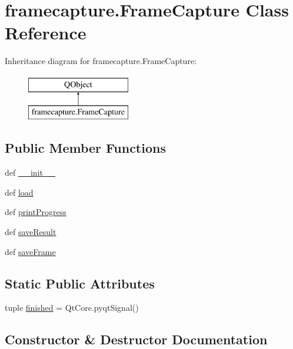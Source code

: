 \hypertarget{classframecapture_1_1FrameCapture}{}\section{framecapture.\+Frame\+Capture Class Reference}
\label{classframecapture_1_1FrameCapture}
Inheritance diagram for framecapture.\+Frame\+Capture\+:\begin{figure}[H]
\begin{center}
\leavevmode
\includegraphics[height=2.000000cm]{classframecapture_1_1FrameCapture}
\end{center}
\end{figure}
\subsection*{Public Member Functions}
\begin{DoxyCompactItemize}
\item 
def \hyperlink{classframecapture_1_1FrameCapture_a7fddffa25cbd27aff798074f2696d972}{\+\_\+\+\_\+init\+\_\+\+\_\+}
\item 
def \hyperlink{classframecapture_1_1FrameCapture_ac7365e9bbf54e647d5fe06b0948686cc}{load}
\item 
def \hyperlink{classframecapture_1_1FrameCapture_a9bad639841b0f732bfa888d4a40b04e2}{print\+Progress}
\item 
def \hyperlink{classframecapture_1_1FrameCapture_ae99fb6ee489801fe9c49a98ec2911793}{save\+Result}
\item 
def \hyperlink{classframecapture_1_1FrameCapture_a84d3496cab0c29ef1c5a22a91aeb8a4c}{save\+Frame}
\end{DoxyCompactItemize}
\subsection*{Static Public Attributes}
\begin{DoxyCompactItemize}
\item 
tuple \hyperlink{classframecapture_1_1FrameCapture_a6127aa7f836ec6cb40c7cc2ca5a8e077}{finished} = Qt\+Core.\+pyqt\+Signal()
\end{DoxyCompactItemize}


\subsection{Constructor \& Destructor Documentation}
\hypertarget{classframecapture_1_1FrameCapture_a7fddffa25cbd27aff798074f2696d972}{}
